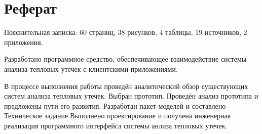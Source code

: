 {
	\titleformat{\section}[block]{\centering\normalfont\large\bfseries}{\thesection}{10pt}{}
	\section*{\centering Реферат}

	\par

		Пояснительная записка: 60 страниц, 38 рисунков, 4 таблицы, 19 источников, 2 приложения.

		Разработано программное средство, обеспечивающее взаимодействие системы анализа тепловых утечек с клиентскими приложениями.

		В процессе выполнения работы проведён аналитический обзор существующих систем анализа тепловых утечек. Выбран прототип. Проведён анализ прототипа и предложены пути его развития. Разработан пакет моделей и составлено Техническое задание.Выполнено проектирование и получена инженерная реализация программного интерфейса системы анлиза тепловых утечек.
}

\pagebreak